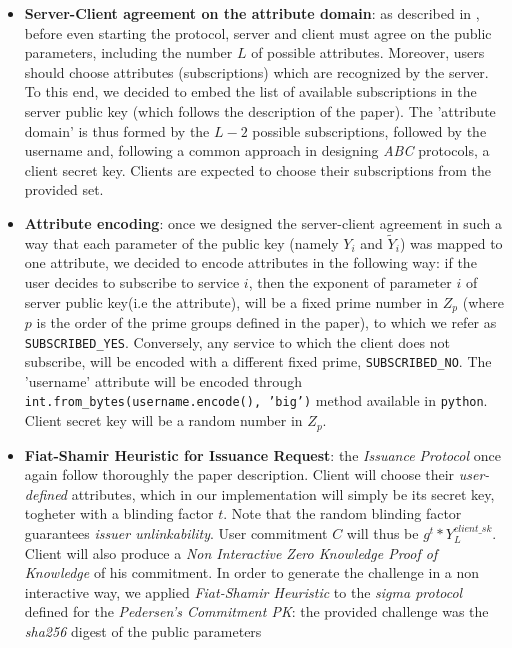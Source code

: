\documentclass[10pt,conference,compsocconf]{IEEEtran}
\begin{document}
\begin{itemize}
    \item \textbf{Server-Client agreement on the attribute domain}: as described in \cite{PS_signature}, before even starting the protocol,
    server and client must agree on the public parameters, including the number $L$ of possible attributes. Moreover, users should choose
    attributes (subscriptions) which are recognized by the server. To this end, we decided to embed the list of available subscriptions
    in the server public key (which follows the description of the paper). The 'attribute domain' is thus formed by the $L-2$ possible
    subscriptions, followed by the username and, following a common approach in designing \textit{ABC} protocols, a client secret key.
    Clients are expected to choose their subscriptions from the provided set.
    \item \textbf{Attribute encoding}: once we designed the server-client agreement in such a way that each parameter of the public key
    (namely $Y_i$ and $\tilde{Y}_{i}$) was mapped to one attribute, we decided to encode attributes in the following way:
    if the user decides to subscribe to service $i$, then the exponent of parameter $i$ of server public key(i.e the attribute),
     will be a fixed prime number in $Z_p$ (where $p$ is the order of the prime groups defined in the paper),
    to which we refer as \texttt{SUBSCRIBED\_YES}. Conversely, any service to which the client does not subscribe,
    will be encoded with a different fixed prime, \texttt{SUBSCRIBED\_NO}. The 'username' attribute will be encoded through
    \texttt{int.from\_bytes(username.encode(), 'big')} method available in \texttt{python}. Client secret key will be a
    random number in $Z_p$.
    \item \textbf{Fiat-Shamir Heuristic for Issuance Request}: the \textit{Issuance Protocol} once again follow thoroughly the paper description.
    Client will choose their \textit{user-defined} attributes, which in our implementation will simply be its secret key,
    togheter with a blinding factor $t$. Note that the random blinding factor guarantees \textit{issuer unlinkability}. User commitment $C$ will thus be $g^{t}*Y_{L}^{client\_sk}$. Client will also produce a
    \textit{Non Interactive Zero Knowledge Proof of Knowledge} of his commitment. In order to generate the challenge in a
    non interactive way, we applied \textit{Fiat-Shamir Heuristic} to the \textit{sigma protocol} defined for the
    \textit{Pedersen's Commitment PK}: the provided challenge was the \textit{sha256} digest of the public parameters

\end{itemize}
\end{document}
